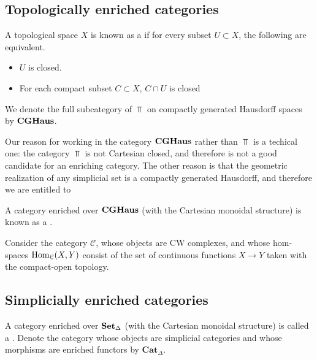 \documentclass[main.tex]{subfiles}
\begin{document}
\subsection{Topologically enriched categories}
\label{ssc:topologically_enriched_categories}

\begin{definition}
  \label{def:compactly_generated_hausdorff_space}
  A topological space $X$ is known as a  if for every subset $U \subset X$, the following are equivalent.
  \begin{itemize}
    \item $U$ is closed.

    \item For each compact subset $C \subset X$, $C \cap U$ is closed
  \end{itemize}

  We denote the full subcategory of $\Top$ on compactly generated Hausdorff spaces by $\mathbf{CGHaus}$.
\end{definition}

Our reason for working in the category $\mathbf{CGHaus}$ rather than $\Top$ is a techical one: the category $\Top$ is not Cartesian closed, and therefore is not a good candidate for an enriching category. The other reason is that the geometric realization of any simplicial set is a compactly generated Hausdorff, and therefore we are entitled to

\begin{definition}
  \label{def:topological_category}
  A category enriched over $\mathbf{CGHaus}$ (with the Cartesian monoidal structure) is known as a .
\end{definition}

\begin{example}
  Consider the category $\mathcal{C}$, whose objects are CW complexes, and whose hom-spaces $\operatorname{Hom}_{\mathcal{C}}(X, Y)$ consist of the set of continuous functions $X \to Y$ taken with the compact-open topology.
\end{example}

\subsection{Simplicially enriched categories}
\label{ssc:simplicially_enriched_categories}

\begin{definition}
  \label{def:simplicial_category}
  A category enriched over $\operatorname{\mathbf{Set}_{\Delta}}$ (with the Cartesian monoidal structure) is called a . Denote the category whose objects are simplicial categories and whose morphisms are enriched functors by $\mathbf{Cat}_{\Delta}$.
\end{definition}
\end{document}

